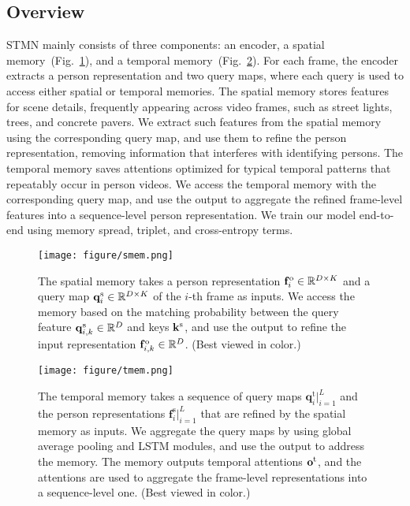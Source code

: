 \documentclass[10pt,twocolumn,letterpaper]{article}
\begin{document}
	\vspace{-0.1cm}
	\subsection{Overview} \label{subsec:overview}
	\vspace{-0.2cm}
	
		STMN mainly consists of three components: an encoder, a spatial memory~(Fig.~\ref{fig:spatial_memory}), and a temporal memory~(Fig.~\ref{fig:temporal_memory}). For each frame, the encoder extracts a person representation and two query maps, where each query is used to access either spatial or temporal memories. The spatial memory stores features for scene details, frequently appearing across video frames, such as street lights, trees, and concrete pavers. We extract such features from the spatial memory using the corresponding query map, and use them to refine the person representation, removing information that interferes with identifying persons. The temporal memory saves attentions optimized for typical temporal patterns that repeatably occur in person videos. We access the temporal memory with the corresponding query map, and use the output to aggregate the refined frame-level features into a sequence-level person representation. We train our model end-to-end using memory spread, triplet, and cross-entropy terms.
		
		\begin{figure}
			\centering
			\texttt{[image: figure/smem.png]}
		\caption{The spatial memory takes a person representation $\mathbf{f}^{\text o}_i \in \mathbb{R}^{D \times K}$ and a query map $\mathbf{q}^{\text s}_i \in \mathbb{R}^{D \times K}$ of the $i$-th frame as inputs. We access the memory based on the matching probability between the query feature $\mathbf{q}^{\text s}_{i,k} \in \mathbb{R}^{D}$ and keys $\mathbf{k}^{\text s}$, and use the output to refine the input representation $\mathbf{f}^{\text o}_{i,k} \in \mathbb{R}^{D}$. (Best viewed in color.)}
		\vspace{-0.5cm}
		\label{fig:spatial_memory}
		\end{figure}
		
		\begin{figure*}
			\centering
			\texttt{[image: figure/tmem.png]}
		\caption{The temporal memory takes a sequence of query maps $\mathbf{q}^\text{t}_i |_{i=1}^L$ and the person representations $\mathbf{f}^\text{s}_i |_{i=1}^L$ that are refined by the spatial memory as inputs. We aggregate the query maps by using global average pooling and LSTM modules, and use the output to address the memory. The memory outputs temporal attentions $\mathbf{o}^{\text t}$, and the attentions are used to aggregate the frame-level representations into a sequence-level one. (Best viewed in color.)}
		\vspace{-0.5cm}
		\label{fig:temporal_memory}
		\end{figure*}
		
\end{document}
